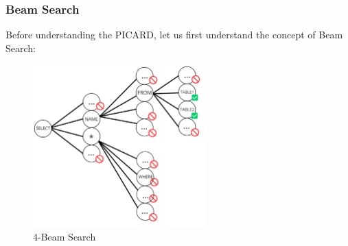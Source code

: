 \clearpage




\subsubsection*{Beam Search}
Before understanding the PICARD, let us first understand the concept of Beam Search:

\begin{figure}[h]
    \centering
    \includegraphics[width=0.6\textwidth]{pics/picard/beam.png}
    \caption{4-Beam Search}
    \label{fig:beam_search}
\end{figure}


